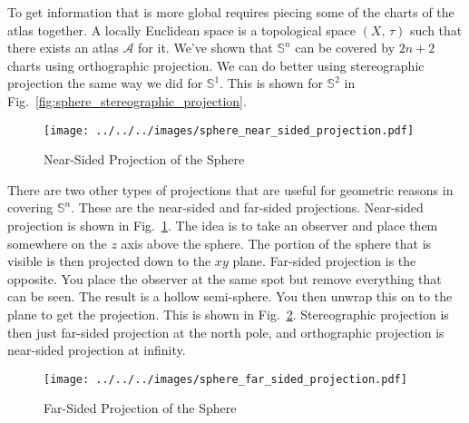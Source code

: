 \documentclass{article}
\theoremstyle{plain}
\theoremstyle{normal}
\begin{document}
        To get information that is more global requires piecing some of the
        charts of the atlas together. A locally Euclidean space is a topological
        space $(X,\,\tau)$ such that there exists an atlas $\mathcal{A}$ for it.
        We've shown that $\mathbb{S}^{n}$ can be covered by $2n+2$ charts using
        orthographic projection. We can do better using stereographic projection
        the same way we did for $\mathbb{S}^{1}$. This is shown for
        $\mathbb{S}^{2}$ in Fig.~\ref{fig:sphere_stereographic_projection}.
        \par\hfill\par
        \begin{figure}
            \centering
            \texttt{[image: ../../../images/sphere\_near\_sided\_projection.pdf]}
            \caption{Near-Sided Projection of the Sphere}
            \label{fig:sphere_near_sided_projection}
        \end{figure}
        There are two other types of projections that are useful for geometric
        reasons in covering $\mathbb{S}^{n}$. These are the near-sided and
        far-sided projections. Near-sided projection is shown in
        Fig.~\ref{fig:sphere_near_sided_projection}. The idea is to take an
        observer and place them somewhere on the $z$ axis above the sphere.
        The portion of the sphere that is visible is then projected down to the
        $xy$ plane. Far-sided projection is the opposite. You place the
        observer at the same spot but remove everything that can be seen.
        The result is a hollow semi-sphere. You then unwrap this on to the
        plane to get the projection. This is shown in
        Fig.~\ref{fig:sphere_far_sided_projection}. Stereographic projection
        is then just far-sided projection at the north pole, and orthographic
        projection is near-sided projection at infinity.
        \begin{figure}
            \centering
            \texttt{[image: ../../../images/sphere\_far\_sided\_projection.pdf]}
            \caption{Far-Sided Projection of the Sphere}
            \label{fig:sphere_far_sided_projection}
        \end{figure}
\end{document}

